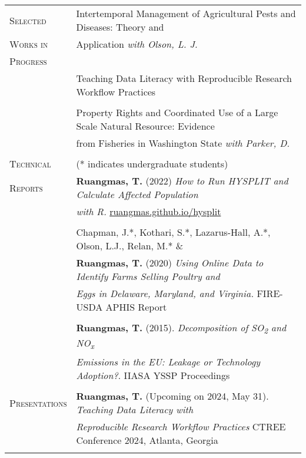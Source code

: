 \documentclass[letterpaper,11pt,oneside]{article}\usepackage[]{graphicx}\usepackage[]{xcolor}
\newcommand{\link}[1]{{\color{blue}\href{#1}{#1}}}
\begin{document}
\begin{tabular}{p{1.2in} l}
\textsc{Selected}	& Intertemporal Management of Agricultural Pests and Diseases: Theory and \\			
\textsc{Works in} & Application \textit{with Olson, L. J.}\\
\textsc{Progress} & \\
                  & Teaching Data Literacy with Reproducible Research Workflow Practices \\
                  & \\
                  & Property Rights and Coordinated Use of a Large Scale Natural Resource: Evidence\\
                	& from Fisheries in Washington State \textit{with Parker, D.}\\				
                  & \\
\textsc{Technical}  & (* indicates undergraduate students) \\
\textsc{Reports}    & \textbf{Ruangmas, T.} (2022) \textit{How to Run HYSPLIT and Calculate Affected Population} \\
                    & \textit{with R.} \link{ruangmas.github.io/hysplit} \\
                    & \\
                        & Chapman, J.*, Kothari, S.*, Lazarus-Hall, A.*, Olson, L.J., Relan, M.* \& \\
                        & \textbf{Ruangmas, T.} (2020) \textit{Using Online Data to Identify Farms Selling Poultry and} \\
                        & \textit{Eggs in Delaware, Maryland, and Virginia.} FIRE-USDA APHIS Report\\
                        & \\
                        & \textbf{Ruangmas, T.} (2015). \textit{Decomposition of SO\textsubscript{2} and NO\textsubscript{x} }  \\
                        &  \textit{Emissions in the EU: Leakage or Technology Adoption?}. IIASA YSSP Proceedings\\
                        & \\	
\textsc{Presentations}  & \textbf{Ruangmas, T.} (Upcoming on 2024, May 31). \textit{Teaching Data Literacy with}\\
                        & \textit{Reproducible Research Workflow Practices} CTREE Conference 2024, Atlanta, Georgia\\
                        & \\
\end{tabular}                        
\end{document}
